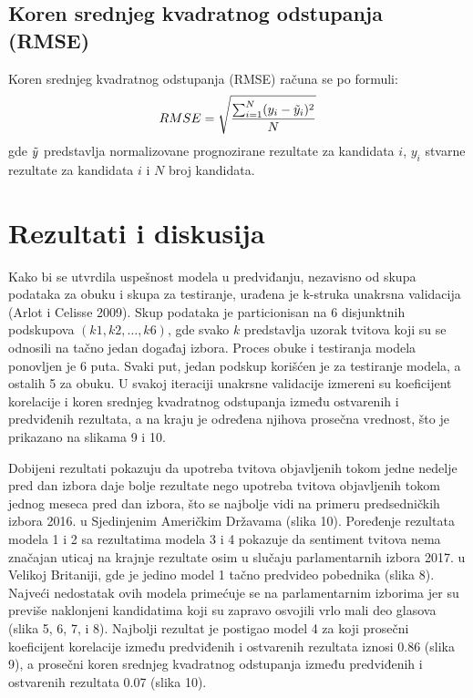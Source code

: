 \subsection{Koren srednjeg kvadratnog odstupanja (RMSE)}

Koren srednjeg kvadratnog odstupanja (RMSE) računa se po formuli:
\begin{equation*}
    RMSE = \sqrt{\frac{\sum^N_{i=1}(y_i - \Tilde{y}_i)^2}{N}}
\end{equation*}
gde $\Tilde{y}$ predstavlja normalizovane prognozirane rezultate za kandidata $i$, $y_i$ stvarne rezultate za
kandidata $i$ i $N$ broj kandidata.

\section{Rezultati i diskusija}

Kako bi se utvrdila uspešnost modela u predviđanju, nezavisno od skupa podataka za obuku i skupa
za testiranje, urađena je k-struka unakrsna validacija (Arlot i Celisse 2009). Skup podataka je
particionisan na 6 disjunktnih podskupova $(k1, k2, \dots, k6)$, gde svako $k$ predstavlja uzorak tvitova koji
su se odnosili na tačno jedan događaj izbora. Proces obuke i testiranja modela ponovljen je 6 puta.
Svaki put, jedan podskup korišćen je za testiranje modela, a ostalih 5 za obuku. U svakoj iteraciji
unakrsne validacije izmereni su koeficijent korelacije i koren srednjeg kvadratnog odstupanja između
ostvarenih i predviđenih rezultata, a na kraju je određena njihova prosečna vrednost, što je prikazano
na slikama 9 i 10.


Dobijeni rezultati pokazuju da upotreba tvitova objavljenih tokom jedne nedelje pred dan izbora daje
bolje rezultate nego upotreba tvitova objavljenih tokom jednog meseca pred dan izbora, što se najbolje
vidi na primeru predsedničkih izbora 2016. u Sjedinjenim Američkim Državama (slika 10). Poređenje
rezultata modela 1 i 2 sa rezultatima modela 3 i 4 pokazuje da sentiment tvitova nema značajan uticaj
na krajnje rezultate osim u slučaju parlamentarnih izbora 2017. u Velikoj Britaniji, gde je jedino model
1 tačno predvideo pobednika (slika 8). Najveći nedostatak ovih modela primećuje se na
parlamentarnim izborima jer su previše naklonjeni kandidatima koji su zapravo osvojili vrlo mali deo
glasova (slika 5, 6, 7, i 8). Najbolji rezultat je postigao model 4 za koji prosečni koeficijent korelacije
između predviđenih i ostvarenih rezultata iznosi 0.86 (slika 9), a prosečni koren srednjeg kvadratnog
odstupanja između predviđenih i ostvarenih rezultata 0.07 (slika 10).

